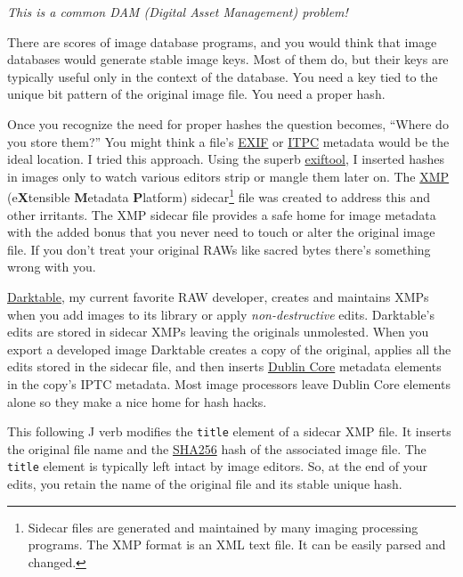 \emph{This is a common DAM (Digital Asset Management) problem!}

There are scores of image database programs, and you would think that
image databases would generate stable image keys. Most of them do, but
their keys are typically useful only in the context of the database. You
need a key tied to the unique bit pattern of the original image file.
You need a proper hash.

Once you recognize the need for proper hashes the question becomes,
``Where do you store them?'' You might think a file's
\href{https://en.wikipedia.org/wiki/Exif}{EXIF} or
\href{https://www.iptc.org/standards/photo-metadata/}{ITPC} metadata
would be the ideal location. I tried this approach. Using the superb
\href{https://exiftool.org/}{exiftool}, I inserted hashes in images only
to watch various editors strip or mangle them later on. The
\href{https://www.adobe.com/products/xmp.html}{XMP} (e\textbf{X}tensible
\textbf{M}etadata \textbf{P}latform)
sidecar\footnote{Sidecar files are generated and maintained by many imaging processing
  programs. The XMP format is an XML text file. It can be easily parsed
  and changed.} file was created to address this and other irritants. The XMP
sidecar file provides a safe home for image metadata with the added
bonus that you never need to touch or alter the original image file. If
you don't treat your original RAWs like sacred bytes there's something
wrong with you.

\href{https://www.darktable.org/}{Darktable}, my current favorite RAW
developer, creates and maintains XMPs when you add images to its library
or apply \emph{non-destructive} edits. Darktable's edits are stored in
sidecar XMPs leaving the originals unmolested. When you export a 
developed image Darktable
creates a copy of the original, applies all the edits stored in the sidecar file, and then 
inserts \href{https://www.dublincore.org/}{Dublin Core} metadata elements in the 
copy's IPTC metadata. Most image processors
leave Dublin Core elements alone so they make a nice home for hash
hacks.

This following J verb modifies the \texttt{title} element of a sidecar XMP file.
It inserts the original file name and the \href{https://www.texttool.com/sha256-online}{SHA256} hash of the associated
image file. The \texttt{title} element is typically left intact by image editors.
So, at the end of your edits, you retain the name of the original file
and its stable unique hash.


